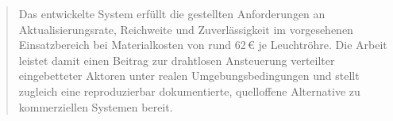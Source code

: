 \begin{abstract}
Das entwickelte System erfüllt die gestellten Anforderungen an Aktualisierungsrate, Reichweite und Zuverlässigkeit im vorgesehenen Einsatzbereich bei Materialkosten von rund 62\,€ je Leuchtröhre.
Die Arbeit leistet damit einen Beitrag zur drahtlosen Ansteuerung verteilter eingebetteter Aktoren unter realen Umgebungsbedingungen und stellt zugleich eine reproduzierbar dokumentierte, quelloffene Alternative zu kommerziellen Systemen bereit.
\end{abstract}

\newpage
\null
\thispagestyle{empty}
\newpage
